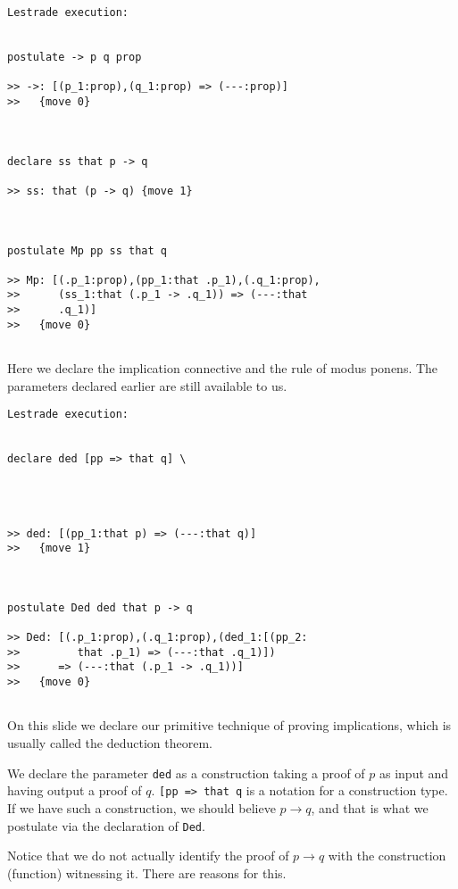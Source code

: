 \documentclass{slides}
\begin{document}
\begin{slide}

\begin{verbatim}Lestrade execution:


postulate -> p q prop

>> ->: [(p_1:prop),(q_1:prop) => (---:prop)]
>>   {move 0}



declare ss that p -> q

>> ss: that (p -> q) {move 1}



postulate Mp pp ss that q

>> Mp: [(.p_1:prop),(pp_1:that .p_1),(.q_1:prop),
>>      (ss_1:that (.p_1 -> .q_1)) => (---:that
>>      .q_1)]
>>   {move 0}


\end{verbatim}

\end{slide}

\begin{slide}

Here we declare the implication connective and the rule of modus ponens.  The parameters declared earlier are still available to us.

\end{slide}

\begin{slide}

\begin{verbatim}Lestrade execution:


declare ded [pp => that q] \
   



>> ded: [(pp_1:that p) => (---:that q)]
>>   {move 1}



postulate Ded ded that p -> q

>> Ded: [(.p_1:prop),(.q_1:prop),(ded_1:[(pp_2:
>>         that .p_1) => (---:that .q_1)])
>>      => (---:that (.p_1 -> .q_1))]
>>   {move 0}


\end{verbatim}
\end{slide}

\begin{slide}

On this slide we declare our primitive technique of proving implications, which is usually called the deduction theorem.

We declare the parameter {\tt ded} as a construction taking a proof of $p$ as input and having output a proof of $q$.  {\tt [pp => that q} is a notation for a construction type.  If we have such a construction,
we should believe $p \rightarrow q$, and that is what we postulate via the declaration of {\tt Ded}.

Notice that we do not actually identify the proof of $p \rightarrow q$ with the construction (function) witnessing it.  There are reasons for this.

\end{slide}
\end{document}
